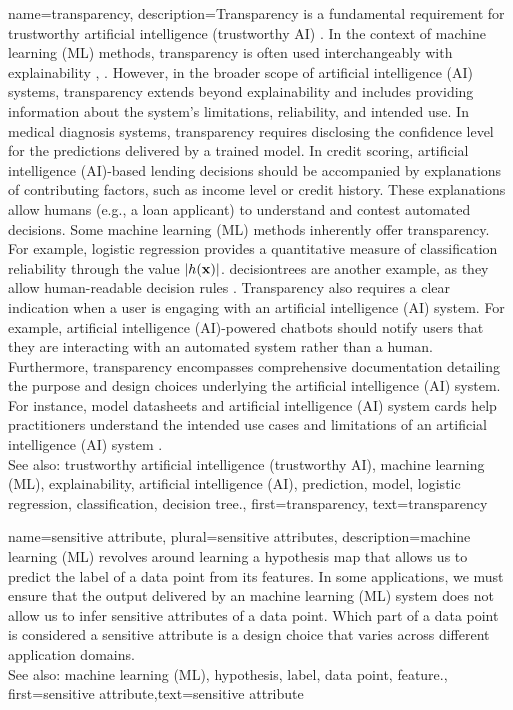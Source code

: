 {name={transparency},
	description={Transparency is a fundamental requirement for 
		trustworthy artificial intelligence (trustworthy AI) \cite{HLEGTrustworhtyAI}. In the context of machine learning (ML) 
		methods, transparency is often used interchangeably with explainability 
		\cite{JunXML2020}, \cite{gallese2023ai}. However, in the broader scope of artificial intelligence (AI) 
		systems, transparency extends beyond explainability and includes providing information 
		about the system’s limitations, reliability, and intended use. 
		In medical diagnosis systems, transparency requires disclosing the confidence level 
		for the predictions delivered by a trained model. In credit scoring, 
		artificial intelligence (AI)-based lending decisions should be accompanied by explanations of 
		contributing factors, such as income level or credit history. These explanations 
		allow humans (e.g., a loan applicant) to understand and contest automated decisions. 
		Some machine learning (ML) methods inherently offer transparency. For example, logistic regression 
		provides a quantitative measure of classification reliability through the value $|h({\bf x})|$. 
		\Glspl{decisiontree} are another example, as they allow human-readable decision rules \cite{rudin2019stop}.
		Transparency also requires a clear indication when a user is engaging with an artificial intelligence (AI) system. 
		For example, artificial intelligence (AI)-powered chatbots should notify users that they are interacting with an 
		automated system rather than a human. Furthermore, transparency encompasses comprehensive 
		documentation detailing the purpose and design choices underlying the artificial intelligence (AI) system. 
		For instance, model datasheets \cite{DatasheetData2021} and artificial intelligence (AI) system cards \cite{10.1145/3287560.3287596} 
		help practitioners understand the intended use cases and limitations of an artificial intelligence (AI) system \cite{Shahriari2017}.
					\\ 
		See also: trustworthy artificial intelligence (trustworthy AI), machine learning (ML), explainability, artificial intelligence (AI), prediction, model, logistic regression, classification, decision tree.},
	first={transparency}, text={transparency} 
}



{name={sensitive attribute}, plural={sensitive attributes},
	description={machine learning (ML) revolves around learning a hypothesis map that allows 
		us to predict the label of a data point from its features. In some 
		applications, we must ensure that the output delivered by an machine learning (ML) system does 
		not allow us to infer sensitive attributes of a data point. Which part 
		of a data point is considered a sensitive attribute is a design 
		choice that varies across different application domains.
					\\ 
		See also: machine learning (ML), hypothesis, label, data point, feature.},
	first={sensitive attribute},text={sensitive attribute} 
}


